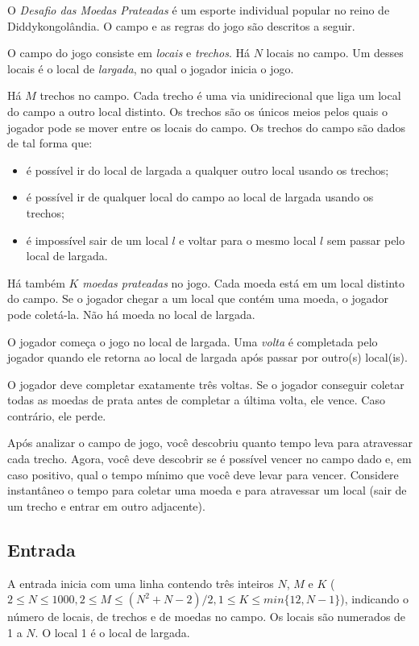 O \textit{Desafio das Moedas Prateadas} é um esporte individual popular no reino de Diddykongolândia. O campo e as regras do jogo são descritos a seguir.

O campo do jogo consiste em \textit{locais} e \textit{trechos}. Há $N$ locais no
campo. Um desses locais é o local de \textit{largada}, no qual o jogador inicia o jogo.

Há $M$ trechos no campo. Cada trecho é uma via unidirecional que liga um local do campo a outro local distinto. Os trechos são os únicos meios pelos quais o jogador pode se mover entre os locais do campo. Os trechos do campo são dados de tal forma que:

\begin{itemize}
    \item é possível ir do local de largada a qualquer outro local usando os trechos;
    \item é possível ir de qualquer local do campo ao local de largada usando os trechos;
    \item é impossível sair de um local $l$ e voltar para o mesmo local $l$ sem passar pelo local de largada.
\end{itemize}

Há também $K$ \textit{moedas prateadas} no jogo. Cada moeda está em um local distinto do campo. Se o jogador chegar a um local que contém uma moeda, o jogador pode coletá-la. Não há moeda no local de largada.

O jogador começa o jogo no local de largada. Uma \textit{volta} é completada pelo jogador quando ele retorna ao local de largada após passar por outro(s) local(is).

O jogador deve completar exatamente três voltas. Se o jogador conseguir coletar todas as moedas de prata antes de completar a última volta, ele vence. Caso contrário, ele perde.

Após analizar o campo de jogo, você descobriu quanto tempo leva para atravessar cada trecho. Agora, você deve descobrir se é possível vencer no campo dado e, em caso positivo, qual o tempo mínimo que você deve levar para vencer. Considere instantâneo o tempo para coletar uma moeda e para atravessar um local (sair de um trecho e entrar em outro adjacente).


\subsection*{Entrada}


A entrada inicia com uma linha contendo três inteiros $N$, $M$ e $K$ ($2 \leq N
        \leq 1000, 2 \leq M \leq (N^2 + N - 2)/2, 1 \leq K \leq min\{12, N-1\}$), indicando o número de locais, de trechos e de moedas no campo. Os locais são numerados de 1 a $N$. O local 1 é o local de largada.

